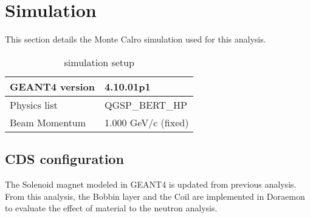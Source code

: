 \section{Simulation}
This section details the Monte Calro simulation used for this analysis.

\begin{table}[]
  \centering
  \caption{simulation setup}
  \begin{tabular}{l|l} \hline
  GEANT4 version & 4.10.01p1   \\ \hline\hline
  Physics list  &  QGSP\_BERT\_HP   \\ \hline\hline
  Beam Momentum & 1.000 GeV/c (fixed)  \\ \hline\hline 
  \end{tabular}
\end{table}

\subsection{CDS configuration}
The Solenoid magnet modeled in GEANT4 is updated from previous analysis\cite{hashimoto:2013dt,sada:2017dt,yamaga:2018dt}.
From this analysis, the Bobbin layer and the Coil are implemented in Doraemon to evaluate the effect of material to the neutron analysis.
 










